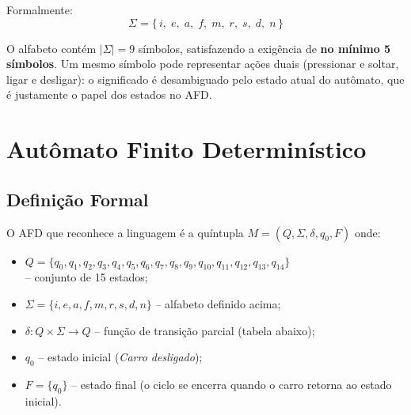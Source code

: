 \documentclass[12pt,a4paper]{article}
\begin{document}
Formalmente:
\[
\Sigma = \{\, i,\; e,\; a,\; f,\; m,\; r,\; s,\; d,\; n \,\}
\]

O alfabeto contém $|\Sigma| = 9$ símbolos, satisfazendo a exigência de \textbf{no mínimo 5 símbolos}. Um mesmo símbolo pode representar ações duais (pressionar e soltar, ligar e desligar): o significado é desambiguado pelo estado atual do autômato, que é justamente o papel dos estados no AFD.

\section{Autômato Finito Determinístico}

\subsection{Definição Formal}
O AFD que reconhece a linguagem é a quíntupla $M = (Q, \Sigma, \delta, q_0, F)$ onde:
\begin{itemize}
    \item $Q = \{q_0, q_1, q_2, q_3, q_4, q_5, q_6, q_7, q_8, q_9, q_{10}, q_{11}, q_{12}, q_{13}, q_{14}\}$\\
    -- conjunto de 15 estados;
    \item $\Sigma = \{i, e, a, f, m, r, s, d, n\}$ -- alfabeto definido acima;
    \item $\delta: Q \times \Sigma \rightarrow Q$ -- função de transição parcial (tabela abaixo);
    \item $q_0$ -- estado inicial (\textit{Carro desligado});
    \item $F = \{q_0\}$ -- estado final (o ciclo se encerra quando o carro retorna ao estado inicial).
\end{itemize}
\end{document}
